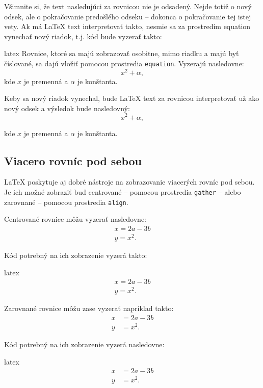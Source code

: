 Všimnite si, že text nasledujúci za rovnicou nie je odsadený. Nejde totiž o nový odsek, ale o pokračovanie predošlého odseku -- dokonca o pokračovanie tej istej vety. Ak má LaTeX text interpretovať takto, nesmie sa za prostredím equation vynechať nový riadok, t.j. kód bude vyzerať takto:
\begin{inlinecode}{latex}
Rovnice, ktoré sa majú zobrazovať osobitne, mimo riadku a majú byť číslované, sa dajú vložiť pomocou prostredia \texttt{equation}. Vyzerajú nasledovne:
\begin{equation}
x^2 + \alpha,
\end{equation}
kde $x$ je premenná a $\alpha$ je konštanta.
\end{inlinecode}

Keby sa nový riadok vynechal, bude LaTeX text za rovnicou interpretovať už ako nový odsek a výsledok bude nasledovný:
\begin{equation}
x^2 + \alpha,
\end{equation}
	
kde $x$ je premenná a $\alpha$ je konštanta.

\subsection{Viacero rovníc pod sebou}

LaTeX poskytuje aj dobré nástroje na zobrazovanie viacerých rovníc pod sebou. Je ich možné zobraziť buď centrované -- pomocou prostredia \texttt{gather} -- alebo zarovnané -- pomocou prostredia \texttt{align}.

Centrované rovnice môžu vyzerať nasledovne:
\begin{gather}
x = 2a - 3b \\
y = x^2.
\end{gather}

Kód potrebný na ich zobrazenie vyzerá takto:
\begin{inlinecode}{latex}
\begin{gather}
x = 2a - 3b \\
y = x^2.
\end{gather}
\end{inlinecode}

Zarovnané rovnice môžu zase vyzerať napríklad takto:
\begin{align}
x &= 2a - 3b \\
y &= x^2.
\end{align}

Kód potrebný na ich zobrazenie vyzerá nasledovne:
\begin{inlinecode}{latex}
\begin{align}
x &= 2a - 3b \\
y &= x^2.
\end{align}
\end{inlinecode}

